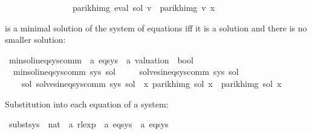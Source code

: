 \begin{isabellebody}
\ \ \ \ \ \ \ \ \ \ \ \ \ \ \ {\isasymlongrightarrow}\ parikh{\isacharunderscore}{\kern0pt}img\ {\isacharparenleft}{\kern0pt}eval\ sol\ v{\isacharprime}{\kern0pt}{\isacharparenright}{\kern0pt}\ {\isasymsubseteq}\ parikh{\isacharunderscore}{\kern0pt}img\ {\isacharparenleft}{\kern0pt}v{\isacharprime}{\kern0pt}\ x{\isacharparenright}{\kern0pt}{\isacharparenright}{\kern0pt}{\isachardoublequoteclose}%
\begin{isamarkuptext}%
 is a minimal solution of the system  of equations iff it is a solution
and there is no smaller solution:%
\end{isamarkuptext}\isamarkuptrue%
\isamarkupfalse%
\ min{\isacharunderscore}{\kern0pt}sol{\isacharunderscore}{\kern0pt}ineq{\isacharunderscore}{\kern0pt}sys{\isacharunderscore}{\kern0pt}comm\ {\isacharcolon}{\kern0pt}{\isacharcolon}{\kern0pt}\ {\isachardoublequoteopen}{\isacharprime}{\kern0pt}a\ eq{\isacharunderscore}{\kern0pt}sys\ {\isasymRightarrow}\ {\isacharprime}{\kern0pt}a\ valuation\ {\isasymRightarrow}\ bool{\isachardoublequoteclose}\ \isanewline
\ \ {\isachardoublequoteopen}min{\isacharunderscore}{\kern0pt}sol{\isacharunderscore}{\kern0pt}ineq{\isacharunderscore}{\kern0pt}sys{\isacharunderscore}{\kern0pt}comm\ sys\ sol\ {\isasymequiv}\isanewline
\ \ \ \ solves{\isacharunderscore}{\kern0pt}ineq{\isacharunderscore}{\kern0pt}sys{\isacharunderscore}{\kern0pt}comm\ sys\ sol\ {\isasymand}\isanewline
\ \ \ \ {\isacharparenleft}{\kern0pt}{\isasymforall}sol{\isacharprime}{\kern0pt}{\isachardot}{\kern0pt}\ solves{\isacharunderscore}{\kern0pt}ineq{\isacharunderscore}{\kern0pt}sys{\isacharunderscore}{\kern0pt}comm\ sys\ sol{\isacharprime}{\kern0pt}\ {\isasymlongrightarrow}\ {\isacharparenleft}{\kern0pt}{\isasymforall}x{\isachardot}{\kern0pt}\ parikh{\isacharunderscore}{\kern0pt}img\ {\isacharparenleft}{\kern0pt}sol\ x{\isacharparenright}{\kern0pt}\ {\isasymsubseteq}\ parikh{\isacharunderscore}{\kern0pt}img\ {\isacharparenleft}{\kern0pt}sol{\isacharprime}{\kern0pt}\ x{\isacharparenright}{\kern0pt}{\isacharparenright}{\kern0pt}{\isacharparenright}{\kern0pt}{\isachardoublequoteclose}%
\begin{isamarkuptext}%
Substitution into each equation of a system:%
\end{isamarkuptext}\isamarkuptrue%
\isamarkupfalse%
\ subst{\isacharunderscore}{\kern0pt}sys\ {\isacharcolon}{\kern0pt}{\isacharcolon}{\kern0pt}\ {\isachardoublequoteopen}{\isacharparenleft}{\kern0pt}nat\ {\isasymRightarrow}\ {\isacharprime}{\kern0pt}a\ rlexp{\isacharparenright}{\kern0pt}\ {\isasymRightarrow}\ {\isacharprime}{\kern0pt}a\ eq{\isacharunderscore}{\kern0pt}sys\ {\isasymRightarrow}\ {\isacharprime}{\kern0pt}a\ eq{\isacharunderscore}{\kern0pt}sys{\isachardoublequoteclose}\ \isanewline

\end{isabellebody}
